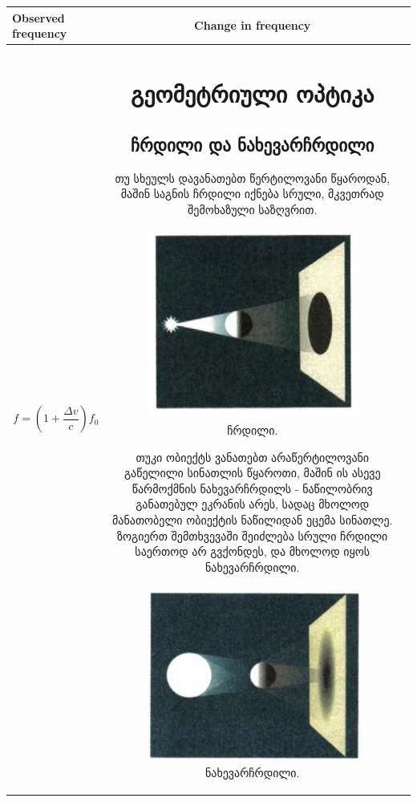 \documentclass{book}
\begin{document}
\begin{tabular}{|l|c|c|}
\hline
Observed frequency & Change in frequency\\
\hline
\begin{displaymath}
f = \left(1+\frac{\Delta v}{c}\right) f_0
\end{displaymath} & 


\chapter{გეომეტრიული ოპტიკა}
\section{ჩრდილი და ნახევარჩრდილი} 
თუ სხეულს დავანათებთ წერტილოვანი წყაროდან, მაშინ საგნის ჩრდილი იქნება სრული, მკვეთრად შემოხაზული საზღვრით. 
		\begin{figure}[H]
		   \centering
           \includegraphics[width=0.3\columnwidth]{figures/shadow}
           \caption{ჩრდილი.}
           \label{fig:shadow}
        \end{figure}
        
თუკი ობიექტს ვანათებთ არაწერტილოვანი გაწელილი სინათლის წყაროთი, მაშინ ის ასევე წარმოქმნის ნახევარჩრდილს - ნაწილობრივ განათებულ ეკრანის არეს, სადაც მხოლოდ მანათობელი ობიექტის ნაწილიდან ეცემა სინათლე. ზოგიერთ შემთხვევაში შეიძლება სრული ჩრდილი საერთოდ არ გვქონდეს, და მხოლოდ იყოს ნახევარჩრდილი.
		\begin{figure}[H]
		   \centering
           \includegraphics[width=0.3\columnwidth]{figures/penumbra}
           \caption{ნახევარჩრდილი.}
           \label{fig:penumbra}
        \end{figure}
        

\end{tabular}
\end{document}
